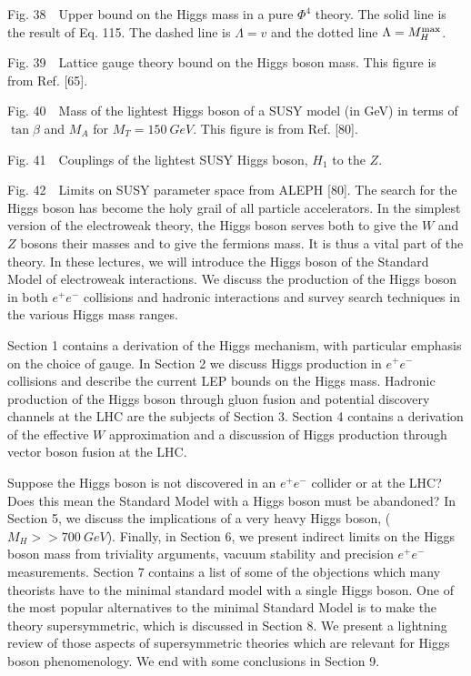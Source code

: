Fig. 38~~Upper bound on the Higgs mass in a pure $\Phi^4$ theory.
The solid line is the result of Eq. 115.
The dashed line is $\Lambda=v$ and the dotted line
$\Lambda=M_H^{\rm max}$.

Fig. 39~~Lattice gauge theory bound on the Higgs boson mass.  This figure
is from Ref. [65].

Fig. 40~~Mass of the lightest Higgs boson of a SUSY model
(in GeV)  in terms
of $\tan\beta$ and $M_A$ for $M_T=150~GeV$.  This figure is from Ref. [80].

Fig. 41~~Couplings of the lightest SUSY Higgs boson, $H_1$ to
the $Z$.


Fig. 42~~Limits on SUSY parameter space from ALEPH [80].
\clearpage
The search for the Higgs boson has become the holy grail of
all particle accelerators. In the simplest version of the
electroweak theory, the Higgs boson serves both to give
the $W$ and $Z$ bosons their masses and to give the fermions
mass.   It is thus a vital part of the theory.
   In these lectures, we will introduce
the Higgs boson of the Standard Model of electroweak interactions.\cite{hhg}
We discuss the production of the Higgs boson in both $e^+e^-$ collisions and
hadronic interactions and survey search techniques
in the various Higgs mass ranges.\cite{bag}

Section 1 contains a derivation of the Higgs mechanism, with particular
emphasis on the choice of gauge.  In Section 2 we
 discuss  Higgs production in $e^+e^-$ collisions and
describe the current LEP bounds on the Higgs mass.  Hadronic
production of the Higgs boson through gluon fusion
and potential discovery channels at the LHC are the subjects
of Section 3.  Section 4 contains a derivation of the effective
$W$ approximation and a discussion of Higgs production through vector
boson fusion at the LHC.

Suppose the Higgs boson is not discovered in an
$e^+ e^-$ collider or at the LHC?  Does this mean the
Standard Model with a Higgs boson must be abandoned?  In
Section 5, we discuss the implications of a very heavy Higgs boson,
($M_H>> 700~GeV$).  Finally, in Section 6, we present indirect
limits on the Higgs boson mass from triviality arguments,
 vacuum stability
and precision $e^+e^-$ measurements.  Section 7 contains
a list of some of the objections which many theorists
 have to the minimal standard model
with a single Higgs boson.  One of the most popular alternatives to the
minimal Standard Model is to make the theory supersymmetric, which is
discussed in Section 8.  We present a lightning review of those
aspects of supersymmetric theories which are
relevant for Higgs boson phenomenology.
We end with some conclusions in
Section 9.

